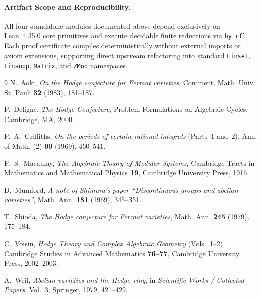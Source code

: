 \documentclass[11pt,a4paper]{article}
\begin{document}
\paragraph*{Artifact Scope and Reproducibility.}
All four standalone modules documented above depend exclusively on Lean~4.35.0 core primitives and execute decidable finite reductions via \texttt{by rfl}. Each proof certificate compiles deterministically without external imports or axiom extensions, supporting direct upstream refactoring into standard \texttt{Finset}, \texttt{Finsupp}, \texttt{Matrix}, and \texttt{ZMod} namespaces.

\begin{thebibliography}{9}
N.~Aoki, \emph{On the Hodge conjecture for Fermat varieties}, Comment. Math. Univ. St. Pauli \textbf{32} (1983), 181--187.

P.~Deligne, \emph{The Hodge Conjecture}, Problem Formulations on Algebraic Cycles, Cambridge, MA, 2000.

P.~A.~Griffiths, \emph{On the periods of certain rational integrals} (Parts~1 and~2), Ann. of Math. (2) \textbf{90} (1969), 460--541.

F.~S.~Macaulay, \emph{The Algebraic Theory of Modular Systems}, Cambridge Tracts in Mathematics and Mathematical Physics \textbf{19}, Cambridge University Press, 1916.

D.~Mumford, \emph{A note of Shimura's paper ``Discontinuous groups and abelian varieties''}, Math. Ann. \textbf{181} (1969), 345--351.

T.~Shioda, \emph{The Hodge conjecture for Fermat varieties}, Math. Ann. \textbf{245} (1979), 175--184.

C.~Voisin, \emph{Hodge Theory and Complex Algebraic Geometry} (Vols.~1--2), Cambridge Studies in Advanced Mathematics \textbf{76--77}, Cambridge University Press, 2002--2003.

A.~Weil, \emph{Abelian varieties and the Hodge ring}, in \emph{Scientific Works / Collected Papers}, Vol.~3, Springer, 1979, 421--429.
\end{thebibliography}
\end{document}
